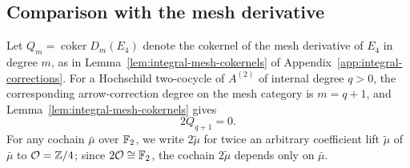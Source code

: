\subsection{Comparison with the mesh derivative}

Let $Q_m=\operatorname{coker}D_m(E_4)$ denote the cokernel of the mesh derivative of $E_4$ in degree $m$, as in Lemma~\ref{lem:integral-mesh-cokernels} of Appendix~\ref{app:integral-corrections}. For a Hochschild two-cocycle of $A^{(2)}$ of internal degree $q>0$, the corresponding arrow-correction degree on the mesh category is $m=q+1$, and Lemma~\ref{lem:integral-mesh-cokernels} gives
\begin{equation}
  2Q_{q+1}=0.
  \label{eq:mod-four-mesh-annihilator}
\end{equation}
For any cochain $\bar\mu$ over $\mathbb F_2$, we write $2\widetilde\mu$ for twice an arbitrary coefficient lift $\widetilde\mu$ of $\bar\mu$ to $\mathcal O=\mathbb Z/4$; since $2\mathcal O\cong\mathbb F_2$, the cochain $2\widetilde\mu$ depends only on $\bar\mu$.

